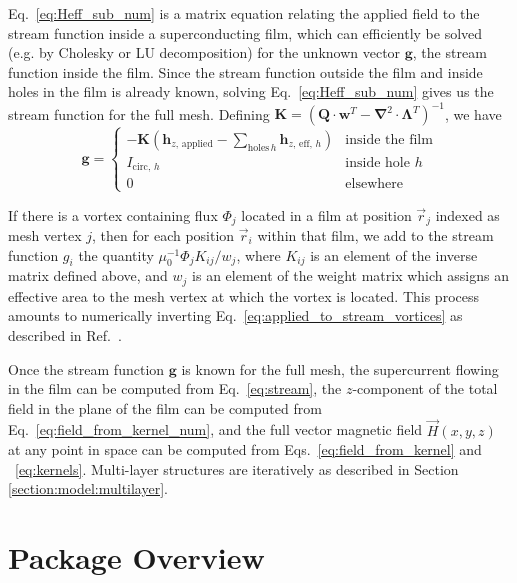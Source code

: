 \documentclass[final,3p,times,twocolumn]{elsarticle}
\newcounter{bla}
\begin{document}
Eq.~\ref{eq:Heff_sub_num} is a matrix equation relating the applied field to the stream function
inside a superconducting film, which can efficiently be solved (e.g. by Cholesky or LU decomposition) for the unknown vector $\mathbf{g}$, the stream function inside the film. Since the stream function outside the film and inside holes in the film is already known, solving Eq.~\ref{eq:Heff_sub_num} gives us the stream function for the full mesh. Defining $\mathbf{K} = \left(\mathbf{Q}\cdot\mathbf{w}^T-\mathbf{\nabla}^2\cdot\mathbf{\Lambda}^T\right)^{-1}$, we have
\begin{equation}
    \label{eq:full_stream}
    \mathbf{g} = \begin{cases}
        -\mathbf{K}
        \left(\mathbf{h}_{z,\,\mathrm{applied}} - \sum_{\mathrm{holes}\,h}\mathbf{h}_{z,\,\mathrm{eff},\,h}\right)
            & \text{inside the film}\\
        I_{\mathrm{circ},\,h}
            & \text{inside hole }h\\
        0
            & \text{elsewhere}
    \end{cases}
\end{equation}

If there is a vortex containing flux $\Phi_j$ located in a film at position $\vec{r}_j$ indexed as mesh vertex $j$, then for each position $\vec{r}_i$ within that film, we add to the stream function $g_i$ the quantity $\mu_0^{-1}\Phi_jK_{ij} / w_{j}$, where $K_{ij}$ is an element of the inverse matrix defined above, and $w_{j}$ is an element of the weight matrix which assigns an effective area to the mesh vertex at which the vortex is located. This process amounts to numerically inverting Eq.~\ref{eq:applied_to_stream_vortices} as described in Ref.~\cite{Brandt2005-wj}.

Once the stream function $\mathbf{g}$ is known for the full mesh,
the supercurrent flowing in the film can be computed from Eq.~\ref{eq:stream}, the $z$-component of the total field in the plane of the film can be computed
from Eq.~\ref{eq:field_from_kernel_num}, and the full vector magnetic field $\vec{H}(x, y, z)$
at any point in space can be computed from Eqs.~\ref{eq:field_from_kernel} and ~\ref{eq:kernels}. Multi-layer structures are  iteratively as described in Section \ref{section:model:multilayer}.

\section{Package Overview}
\label{section:overview}
\end{document}
